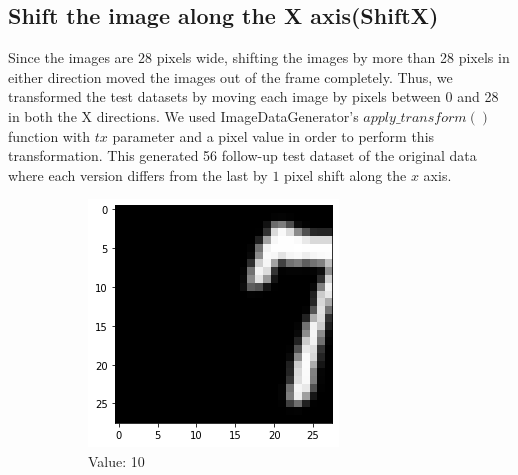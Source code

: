 \subsection{Shift the image along the X axis(ShiftX)}
Since the images are $28$ pixels wide, shifting the images by more than 28 pixels in either direction moved the images out of the frame completely. Thus, we transformed the test datasets by moving each image by pixels between 0 and 28 in both the X directions. We used ImageDataGenerator's $apply\_transform()$ function with $tx$ parameter and a pixel value in order to perform this transformation. This generated 56 follow-up test dataset of the original data where each version differs from the last by $1$ pixel shift along the $x$ axis.
    \begin{figure}[htb!]
        \centering
        \begin{subfigure}[b]{.3\textwidth}
            \centering
            \includegraphics[width=\linewidth]{images/shiftx1.png}
            \caption{Value: 10}
            \label{fig:Rotate-misclass0}
        \end{subfigure}%
        \begin{subfigure}[b]{.3\textwidth}
            \centering

\end{subfigure}
\end{figure}
